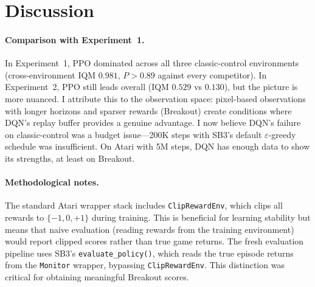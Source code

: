 \section{Discussion}
\label{sec:atari-discussion}

\paragraph{Comparison with Experiment~1.}
In Experiment~1, PPO dominated across all three classic-control
environments (cross-environment IQM $0.981$, $P > 0.89$ against
every competitor). In Experiment~2, PPO still leads overall (IQM
$0.529$ vs $0.130$), but the picture is more nuanced. I attribute
this to the observation space: pixel-based observations with
longer horizons and sparser rewards (Breakout) create conditions
where DQN's replay buffer provides a genuine advantage. I now
believe DQN's failure on classic-control was a budget issue---200K
steps with SB3's default $\varepsilon$-greedy schedule was
insufficient. On Atari with 5M steps, DQN has enough data to show
its strengths, at least on Breakout.

\paragraph{Methodological notes.}
The standard Atari wrapper stack includes \texttt{ClipRewardEnv},
which clips all rewards to $\{-1, 0, +1\}$ during training. This
is beneficial for learning stability but means that naive evaluation
(reading rewards from the training environment) would report clipped
scores rather than true game returns. The fresh evaluation pipeline
uses SB3's \texttt{evaluate\_policy()}, which reads the true episode
returns from the \texttt{Monitor} wrapper, bypassing
\texttt{ClipRewardEnv}. This distinction was critical for obtaining
meaningful Breakout scores.

